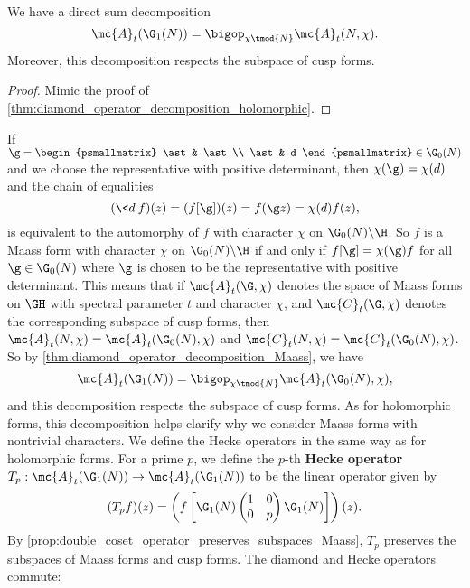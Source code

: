     \begin{proposition}\label{thm:diamond_operator_decomposition_Maass}
      We have a direct sum decomposition
      \[
        \mc{A}_{t}(\G_{1}(N)) = \bigop_{\chi \tmod{N}}\mc{A}_{t}(N,\chi).
      \]
      Moreover, this decomposition respects the subspace of cusp forms.
    \end{proposition}
    \begin{proof}
      Mimic the proof of \cref{thm:diamond_operator_decomposition_holomorphic}.
    \end{proof}

    If $\g = \begin{psmallmatrix} \ast & \ast \\ \ast & d \end{psmallmatrix} \in \G_{0}(N)$ and we choose the representative with positive determinant, then $\chi(\g) = \chi(d)$ and the chain of equalities
    \[
      (\<d\>f)(z) = (f[\g])(z) = f(\g z) = \chi(d)f(z),
    \]
    is equivalent to the automorphy of $f$ with character $\chi$ on $\G_{0}(N)\backslash\H$. So $f$ is a Maass form with character $\chi$ on $\G_{0}(N)\backslash\H$ if and only if $f[\g] = \chi(\g)f$ for all $\g \in \G_{0}(N)$ where $\g$ is chosen to be the representative with positive determinant. This means that if $\mc{A}_{t}(\G,\chi)$ denotes the space of Maass forms on $\GH$ with spectral parameter $t$ and character $\chi$, and $\mc{C}_{t}(\G,\chi)$ denotes the corresponding subspace of cusp forms, then $\mc{A}_{t}(N,\chi) = \mc{A}_{t}(\G_{0}(N),\chi)$ and $\mc{C}_{t}(N,\chi) = \mc{C}_{t}(\G_{0}(N),\chi)$. So by \cref{thm:diamond_operator_decomposition_Maass}, we have
    \[
      \mc{A}_{t}(\G_{1}(N)) = \bigop_{\chi \tmod{N}}\mc{A}_{t}(\G_{0}(N),\chi),
    \]
    and this decomposition respects the subspace of cusp forms. As for holomorphic forms, this decomposition helps clarify why we consider Maass forms with nontrivial characters. We define the Hecke operators in the same way as for holomorphic forms. For a prime $p$, we define the $p$-th \textbf{Hecke operator} $T_{p}:\mc{A}_{t}(\G_{1}(N)) \to \mc{A}_{t}(\G_{1}(N))$ to be the linear operator given by
    \[
      (T_{p}f)(z) = \left(f\left[\G_{1}(N)\begin{pmatrix} 1 & 0 \\ 0 & p \end{pmatrix}\G_{1}(N)\right]\right)(z).
    \]
    By \cref{prop:double_coset_operator_preserves_subspaces_Maass}, $T_{p}$ preserves the subspaces of Maass forms and cusp forms. The diamond and Hecke operators commute:

